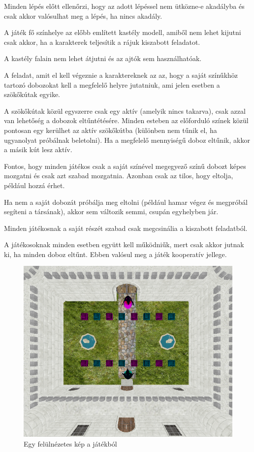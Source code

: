Minden lépés előtt ellenőrzi, hogy az adott lépéssel nem ütközne-e akadályba és csak akkor valósulhat meg a lépés, ha nincs akadály.


A játék fő színhelye az előbb említett kastély modell, amiből nem lehet kijutni csak akkor, ha a karakterek teljesítik a rájuk kiszabott feladatot.

A kastély falain nem lehet átjutni és az ajtók sem használhatóak.

A feladat, amit el kell végeznie a karaktereknek az az, hogy a saját színűkhöz tartozó dobozokat kell a megfelelő helyre jutatniuk, ami jelen esetben a szökőkútak egyike. 

A szökőkútak közül egyszerre csak egy aktív (amelyik nincs takarva), csak azzal van lehetőség a dobozok eltűntétésére. Minden esteben az előforduló színek közül pontosan egy kerülhet az aktív szökőkútba (különben nem tűnik el, ha ugyanolyat próbálnak beletolni). Ha a megfelelő mennyiségű doboz eltűnik, akkor a másik kút lesz aktív.

Fontos, hogy minden játékos csak a saját színével megegyező színű dobozt képes mozgatni és csak azt szabad mozgatnia. Azonban csak az tilos, hogy eltolja, például hozzá érhet.

Ha nem a saját dobozát próbálja meg eltolni (például hamar végez és megpróbál segíteni a társának), akkor sem változik semmi, csupán egyhelyben jár.

Minden játékosnak a saját részét szabad csak megcsinália a kiszabott feladatból. 

A játékosoknak minden esetben együtt kell működniűk, mert csak akkor jutnak ki, ha minden doboz eltűnt. Ebben valósul meg a játék kooperatív jellege. 

\begin{figure}[htp]
    \centering
   	\includegraphics[scale=0.7]{images/game.png}
	\caption{Egy felülnézetes kép a játékból}
	\label{fig:game}
\end{figure}

